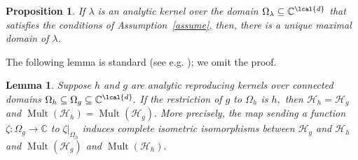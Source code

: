 \documentclass[a4paper,reqno,index]{amsart}
\numberwithin{equation}{section}
\newtheorem{lemma}[theorem]{Lemma}
\newcommand{\CC}{\mathbb{C}}
\newcommand{\Mult}{\operatorname{Mult}}
\newcommand{\cH}{\mathcal{H}}
\newcommand{\psif}{\zeta}
\newtheorem{proposition}[theorem]{Proposition}
\theoremstyle{definition}
\begin{document}
\begin{proposition}  \label{r:odd}
  If  $\lambda$ is an analytic kernel over the  domain $\Omega_\lambda\subseteq \CC^{\lcal{d}}$ that 
   satisfies the conditions of Assumption~\ref{assume}, then, there is a unique maximal domain of $\lambda$.
\end{proposition}

The following lemma is standard (see e.g. \cite[Section 5.4]{PaulsenRagh}); we omit the proof.

\begin{lemma}
\label{l:aspire}
  Suppose $h$ and $g$ are analytic reproducing kernels over  connected domains $\Omega_h\subseteq \Omega_g \subseteq \CC^{\lcal{d}}.$
  If the restriction of $g$ to $\Omega_h$ is $h,$ then   $\cH_h=\cH_g$
  and $\Mult(\cH_h)=\Mult(\cH_g).$  More precisely, the map sending a function
  $\psif:\Omega_g\to \CC$ to $\psif\vert_{\Omega_h}$ induces complete isometric isomorphisms
  between $\cH_g$ and $\cH_h$ and $\Mult(\cH_g)$ and $\Mult(\cH_h).$
\end{lemma}
\end{document}

